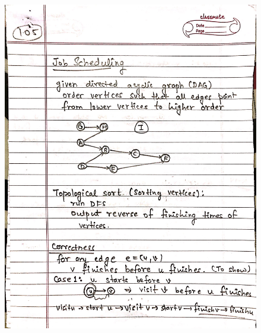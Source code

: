 \begin{figure}[H]
    \centering
    \includegraphics[width=16cm, height=21cm]{"./MIT-6.006/MIT-6006-105"}
\end{figure}
\newpage
